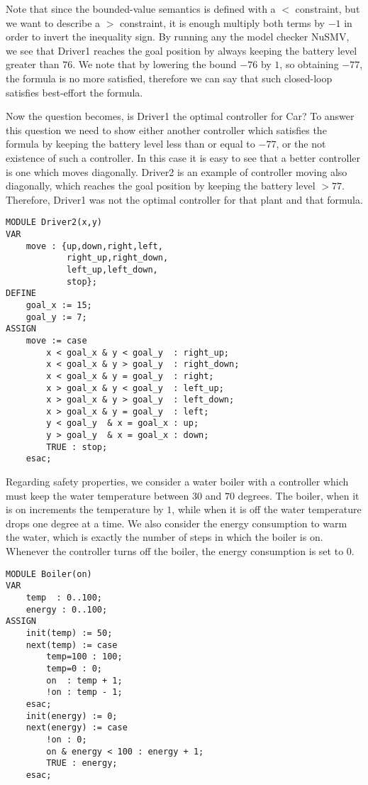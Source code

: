 Note that since the bounded-value semantics is defined with a $<$ constraint, but we want to describe a $>$ constraint, it is enough multiply both terms by $-1$ in order to invert the inequality sign.
By running any the model checker NuSMV, we see that Driver1 reaches the goal position by always keeping the battery level greater than $76$.
We note that by lowering the bound $-76$ by $1$, so obtaining $-77$, the formula is no more satisfied, therefore we can say that such closed-loop satisfies best-effort the formula.

Now the question becomes, is Driver1 the optimal controller for Car?
To answer this question we need to show either another controller which satisfies the formula by keeping the battery level less than or equal to $-77$, or the not existence of such a controller.
In this case it is easy to see that a better controller is one which moves diagonally.
Driver2 is an example of controller moving also diagonally, which reaches the goal position by keeping the battery level $> 77$.
Therefore, Driver1 was not the optimal controller for that plant and that formula.

\begin{lstlisting}[language=smv, caption=Best-effort semantics: Car example (3)]
MODULE Driver2(x,y)
VAR
    move : {up,down,right,left,
            right_up,right_down,
            left_up,left_down,
            stop};
DEFINE 
    goal_x := 15;
    goal_y := 7;
ASSIGN
    move := case
        x < goal_x & y < goal_y  : right_up;
        x < goal_x & y > goal_y  : right_down;
        x < goal_x & y = goal_y  : right;
        x > goal_x & y < goal_y  : left_up;
        x > goal_x & y > goal_y  : left_down;
        x > goal_x & y = goal_y  : left;
        y < goal_y  & x = goal_x : up;
        y > goal_y  & x = goal_x : down;
        TRUE : stop;
    esac;
\end{lstlisting}

Regarding safety properties, we consider a water boiler with a controller which must keep the water temperature between $30$ and $70$ degrees.
The boiler, when it is on increments the temperature by $1$, while when it is off the water temperature drops one degree at a time.
We also consider the energy consumption to warm the water, which is exactly the number of steps in which the boiler is on.
Whenever the controller turns off the boiler, the energy consumption is set to $0$.

\begin{lstlisting}[language=smv, caption=Best-effort semantics: Boiler example (1)]
MODULE Boiler(on)
VAR 
    temp  : 0..100;
    energy : 0..100;
ASSIGN
    init(temp) := 50;
    next(temp) := case
        temp=100 : 100;
        temp=0 : 0;
        on  : temp + 1;
        !on : temp - 1;
    esac;
    init(energy) := 0;
    next(energy) := case
        !on : 0;
        on & energy < 100 : energy + 1;
        TRUE : energy;
    esac;
\end{lstlisting}

